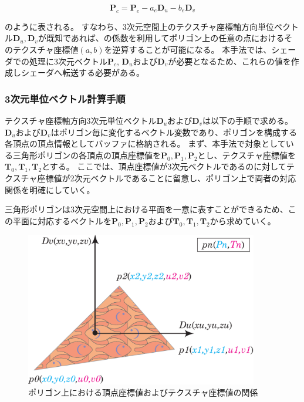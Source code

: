 \begin{equation}
\bm{P}_c = \bm{P}_e - a_e\bm{D}_u - b_e\bm{D}_v
\label{EPc}
\end{equation}

\noindent
{}のように表される。
すなわち、3次元空間上のテクスチャ座標軸方向単位ベクトル$\bm{D}_u, \bm{D}_v$が既知であれば、の係数を利用してポリゴン上の任意の点におけるそのテクスチャ座標値$(a, b)$を逆算することが可能になる。
本手法では、シェーダでの処理に3次元ベクトル$\bm{P}_c$, $\bm{D}_u$および$\bm{D}_v$が必要となるため、これらの値を作成しシェーダへ転送する必要がある。

\subsubsection*{3次元単位ベクトル計算手順}

テクスチャ座標軸方向3次元単位ベクトル$\bm{D}_u$および$\bm{D}_v$は以下の手順で求める。
$\bm{D}_u$および$\bm{D}_v$はポリゴン毎に変化するベクトル変数であり、ポリゴンを構成する各頂点の頂点情報としてバッファに格納される。
まず、本手法で対象としている三角形ポリゴンの各頂点の頂点座標値を$\bm{P}_0,\bm{P}_1,\bm{P}_2$とし、テクスチャ座標値を$\bm{T}_0,\bm{T}_1,\bm{T}_2$とする。
ここでは、頂点座標値が3次元ベクトルであるのに対してテクスチャ座標値が2次元ベクトルであることに留意し、ポリゴン上で両者の対応関係を明確にしていく。

三角形ポリゴンは3次元空間上における平面を一意に表すことができるため、この平面に対応するベクトルを$\bm{P}_0,\bm{P}_1,\bm{P}_2$および$\bm{T}_0,\bm{T}_1,\bm{T}_2$から求めていく。

\begin{figure}[h]
  \centering
  \includegraphics[width=4.0in]{./img/polygon_explain.eps}
  \caption{ポリゴン上における頂点座標値およびテクスチャ座標値の関係}
  \label{FVertexandtexture}
\end{figure}

